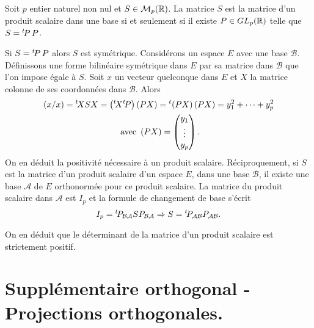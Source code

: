 \begin{prop}
 Soit $p$ entier naturel non nul et $S\in \mathcal M_p(\mathbb{R})$. La matrice $S$ est la matrice d'un produit scalaire dans une base si et seulement si il existe $P\in GL_p(\mathbb{R})$ telle que $S = \mathstrut^t\! P\, P$.
\end{prop}
\begin{demo}
 Si $S = \mathstrut^t\! P\, P$ alors $S$ est symétrique. Considérons un espace $E$ avec une base $\mathcal B$. Définissons une forme bilinéaire symétrique dans $E$ par sa matrice dans $\mathcal{B}$ que l'on impose égale à $S$. Soit $x$ un vecteur quelconque dans $E$ et $X$ la matrice colonne de ses coordonnées dans $\mathcal B$. Alors
\begin{multline*}
 (x/x) = \mathstrut^t\! X S X = \left( \mathstrut^t\! X \mathstrut^t\! P\right) \left(  P X\right) = \mathstrut^t\! \left(  P X\right)\left(  P X\right)
= y_1^2+\cdots+y_p^2 \\
\text{ avec }
\left(  P X\right)
=
\begin{pmatrix}
 y_1\\ \vdots \\ y_p
\end{pmatrix} .
\end{multline*}
On en déduit la positivité nécessaire à un produit scalaire.\newline
Réciproquement, si $S$ est la matrice d'un produit scalaire d'un espace $E$, dans une base $\mathcal{B}$, il existe une base $\mathcal{A}$ de $E$ orthonormée pour ce produit scalaire. La matrice du produit scalaire dans $\mathcal{A}$ est $I_p$ et la formule de changement de base s'écrit
\begin{displaymath}
 I_p = \mathstrut^t\! P_{\mathcal{B}\mathcal{A}} S P_{\mathcal{B}\mathcal{A}} \Rightarrow
S = \mathstrut^t\! P_{\mathcal{A}\mathcal{B}} P_{\mathcal{A}\mathcal{B}}.
\end{displaymath}
\end{demo}
\begin{rem}
 On en déduit que le déterminant de la matrice d'un produit scalaire est strictement positif.
\end{rem}
\clearpage
\section{Supplémentaire orthogonal - Projections orthogonales.}
